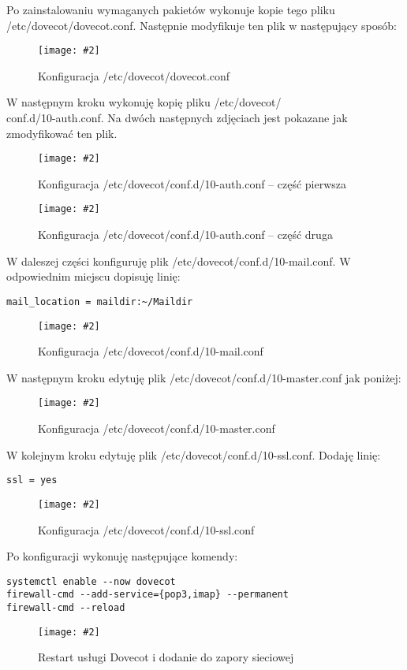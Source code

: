 \documentclass[a4paper]{article}
\newcommand*{\zdj}[2][\textwidth]{\texttt{[image: \#2]}}
\newcommand*{\fg}[4][!htb]{
      \begin{figure*}[#1]
            \zdj{#2}
            \caption[#4]{#3}
      \end{figure*}
}
\begin{document}
\vspace*{-10pt}
Po zainstalowaniu wymaganych pakietów wykonuje kopie tego pliku /etc/dovecot/dovecot.conf. Następnie modyfikuje ten plik w następujący sposób: 
\fg{contents/configuration/POP-IMAP/3.png}{Konfiguracja /etc/dovecot/dovecot.conf}{Konfiguracja /etc/dovecot/dovecot.conf}

\vspace*{-10pt}
W następnym kroku wykonuję kopię pliku /etc/dovecot/\\conf.d/10-auth.conf. Na dwóch następnych zdjęciach jest pokazane jak zmodyfikować ten plik.
\fg{contents/configuration/POP-IMAP/5.png}{Konfiguracja /etc/dovecot/conf.d/10-auth.conf – część pierwsza}{Konfiguracja /etc/dovecot/conf.d/10-auth.conf – część pierwsza}

\newpage
\fg{contents/configuration/POP-IMAP/6.png}{Konfiguracja /etc/dovecot/conf.d/10-auth.conf – część druga}{Konfiguracja /etc/dovecot/conf.d/10-auth.conf – część druga}

W daleszej części konfiguruję plik /etc/dovecot/conf.d/10-mail.conf. W odpowiednim miejscu dopisuję linię:
\begin{Verbatim}[frame=single]
      mail_location = maildir:~/Maildir
\end{Verbatim} 
\fg{contents/configuration/POP-IMAP/8.png}{Konfiguracja /etc/dovecot/conf.d/10-mail.conf}{Konfiguracja /etc/dovecot/conf.d/10-mail.conf}

\newpage
W następnym kroku edytuję plik  /etc/dovecot/conf.d/10-master.conf jak poniżej: 
\fg{contents/configuration/POP-IMAP/10.png}{Konfiguracja /etc/dovecot/conf.d/10-master.conf}{Konfiguracja /etc/dovecot/conf.d/10-master.conf}

W kolejnym kroku edytuję plik /etc/dovecot/conf.d/10-ssl.conf. Dodaję linię:
\begin{Verbatim}[frame=single]
ssl = yes
\end{Verbatim} 
\fg{contents/configuration/POP-IMAP/11.png}{Konfiguracja /etc/dovecot/conf.d/10-ssl.conf}{Konfiguracja /etc/dovecot/conf.d/10-ssl.conf}


\newpage
Po konfiguracji wykonuję następujące komendy: 
\vspace*{-5pt}
\begin{Verbatim}[frame=single]
systemctl enable --now dovecot 
firewall-cmd --add-service={pop3,imap} --permanent 
firewall-cmd --reload 
\end{Verbatim}
\vspace*{-14pt}
\fg{contents/configuration/POP-IMAP/12.png}{Restart usługi Dovecot i dodanie do zapory sieciowej}{Restart usługi Dovecot i dodaSnie do zapory sieciowej}
\end{document}
